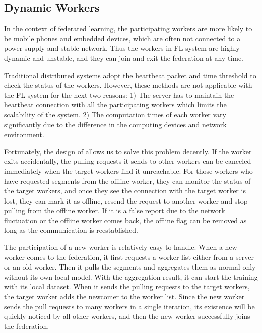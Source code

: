 
\subsection{Dynamic Workers}
In the context of federated learning, the participating workers are more likely to be mobile phones and embedded devices, which are often not connected to a power supply and stable network. Thus the workers in FL system are highly dynamic and unstable, and they can join and exit the federation at any time. 

Traditional distributed systems adopt the heartbeat packet and time threshold to check the status of the workers. However, these methods are not applicable with the FL system for the next two reasons: 1) The server has to maintain the heartbeat connection with all the participating workers which limits the scalability of the system. 2) The computation times of each worker vary significantly due to the difference in the computing devices and network environment.

Fortunately, the design of \sys allows us to solve this problem decently. If the worker exits accidentally, the pulling requests it sends to other workers can be canceled immediately when the target workers find it unreachable. For those workers who have requested segments from the offline worker, they can monitor the status of the target workers, and once they see the connection with the target worker is lost, they can mark it as offline, resend the request to another worker and stop pulling from the offline worker. If it is a false report due to the network fluctuation or the offline worker comes back, the offline flag can be removed as long as the communication is reestablished. 

The participation of a new worker is relatively easy to handle. When a new worker comes to the federation, it first requests a worker list either from a server or an old worker. Then it pulls the segments and aggregates them as normal only without its own local model. With the aggregation result, it can start the training with its local dataset. When it sends the pulling requests to the target workers, the target worker adds the newcomer to the worker list. Since the new worker sends the pull requests to many workers in a single iteration, its existence will be quickly noticed by all other workers, and then the new worker successfully joins the federation.